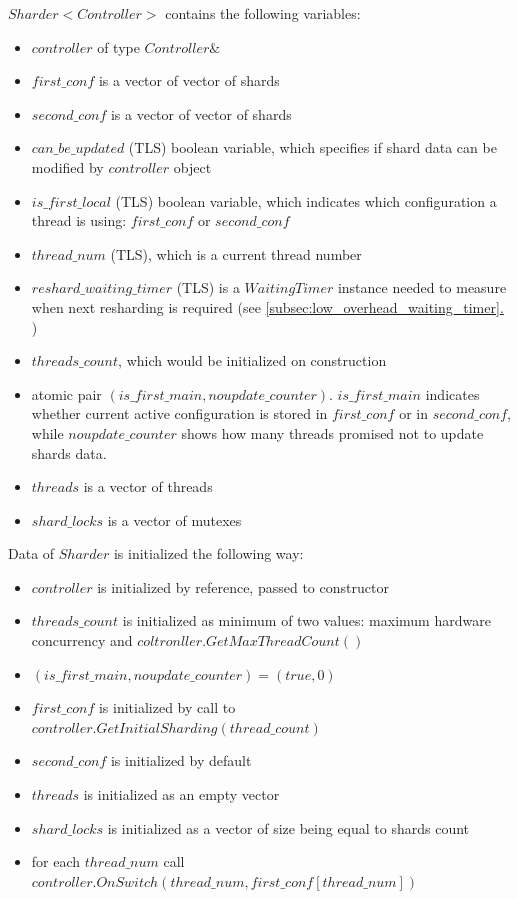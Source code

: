 \documentclass{article}
\newcommand*{\fullref}[1]{\hyperref[{#1}]{\ref*{#1}. \nameref*{#1}}}
\begin{document}
$Sharder<Controller>$ contains the following variables:
\begin{itemize}
	\item $controller$ of type $Controller\&$
	\item $first\_conf$ is a vector of vector of shards
	\item $second\_conf$ is a vector of vector of shards
	\item $can\_be\_updated$ (TLS) boolean variable, which specifies if shard data can be modified by $controller$ object
	\item $is\_first\_local$ (TLS) boolean variable, which indicates which configuration a thread is using: $first\_conf$ or $second\_conf$
	\item $thread\_num$ (TLS), which is a current thread number
	\item $reshard\_waiting\_timer$ (TLS) is a $WaitingTimer$ instance needed to measure when next resharding is required (see \fullref{subsec:low_overhead_waiting_timer})
	\item $threads\_count$, which would be initialized on construction
	\item atomic pair $(is\_first\_main, noupdate\_counter)$. $is\_first\_main$ indicates whether current active configuration is stored in $first\_conf$ or in $second\_conf$, while $noupdate\_counter$ shows how many threads promised not to update shards data.
	\item $threads$ is a vector of threads
	\item $shard\_locks$ is a vector of mutexes
\end{itemize}

Data of $Sharder$ is initialized the following way:
\begin{itemize}
	\item $controller$ is initialized by reference, passed to constructor
	\item $threads\_count$ is initialized as minimum of two values: maximum hardware concurrency and $coltronller.GetMaxThreadCount()$
	\item $(is\_first\_main, noupdate\_counter) = (true, 0)$
	\item $first\_conf$ is initialized by call to $controller.GetInitialSharding(thread\_count)$
	\item $second\_conf$ is initialized by default
	\item $threads$ is initialized as an empty vector
	\item $shard\_locks$ is initialized as a vector of size being equal to shards count
	\item for each $thread\_num$ call $controller.OnSwitch(thread\_num, first\_conf[thread\_num])$
\end{itemize}
\end{document}
